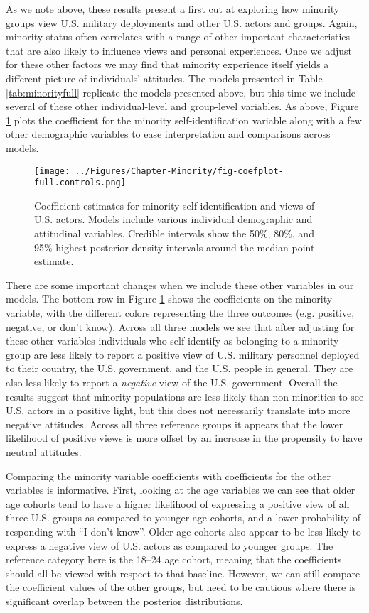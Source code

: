 As we note above, these results present a first cut at exploring how minority groups view U.S. military deployments and other U.S. actors and groups. Again, minority status often correlates with a range of other important characteristics that are also likely to influence views and personal experiences. Once we adjust for these other factors we may find that minority experience itself yields a different picture of individuals' attitudes. The models presented in Table \ref{tab:minorityfull} replicate the models presented above, but this time we include several of these other individual-level and group-level variables. As above, Figure \ref{fig:minoritycoeffull} plots the coefficient for the minority self-identification variable along with a few other demographic variables to ease interpretation and comparisons across models. 


\begin{figure}[t]
	\texttt{[image: ../Figures/Chapter-Minority/fig-coefplot-full.controls.png]}
	\caption{Coefficient estimates for minority self-identification and views of U.S. actors. Models include various individual demographic and attitudinal variables. Credible intervals show the 50\%, 80\%, and 95\% highest posterior density intervals around the median point estimate.}
	\label{fig:minoritycoeffull}
\end{figure}



There are some important changes when we include these other variables in our models. The bottom row in Figure \ref{fig:minoritycoeffull} shows the coefficients on the minority variable, with the different colors representing the three outcomes (e.g. positive, negative, or don't know). Across all three models we see that after adjusting for these other variables individuals who self-identify as belonging to a minority group are less likely to report a positive view of U.S. military personnel deployed to their country, the U.S. government, and the U.S. people in general. They are also less likely to report a \textit{negative} view of the U.S. government. Overall the results suggest that minority populations are less likely than non-minorities to see U.S. actors in a positive light, but this does not necessarily translate into more negative attitudes. Across all three reference groups it appears that the lower likelihood of positive views is more offset by an increase in the propensity to have neutral attitudes. 


Comparing the minority variable coefficients with coefficients for the other variables is informative. First, looking at the age variables we can see that older age cohorts tend to have a higher likelihood of expressing a positive view of all three U.S. groups as compared to younger age cohorts, and a lower probability of responding with ``I don't know''. Older age cohorts also appear to be less likely to express a negative view of U.S. actors as compared to younger groups.  The reference category here is the 18--24 age cohort, meaning that the coefficients should all be viewed with respect to that baseline. However, we can still compare the coefficient values of the other groups, but need to be cautious where there is significant overlap between the posterior distributions. 

